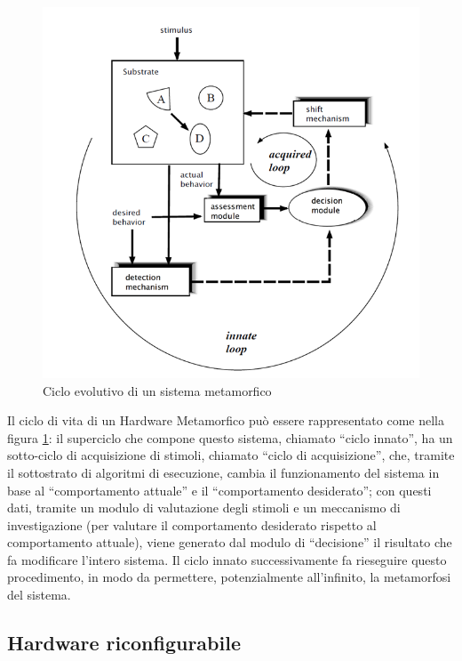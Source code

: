 \documentclass[a4paper,titlepage]{book}
\begin{document}
\begin{figure}
\centering
\includegraphics[scale=0.6]{ciclo_evolutivo.png}
\caption{Ciclo evolutivo di un sistema metamorfico}\label{fig:1}
\end{figure}

Il ciclo di vita di un Hardware Metamorfico può essere rappresentato come nella figura \ref{fig:1}: il superciclo che compone questo sistema, chiamato ``ciclo innato'', ha un sotto-ciclo di acquisizione di stimoli, chiamato ``ciclo di acquisizione'', che, tramite il sottostrato di algoritmi di esecuzione, cambia il funzionamento del sistema in base al ``comportamento attuale'' e il ``comportamento desiderato''; con questi dati, tramite un modulo di valutazione degli stimoli e un meccanismo di investigazione (per valutare il comportamento desiderato rispetto al comportamento attuale), viene generato dal modulo di ``decisione'' il risultato che fa modificare l'intero sistema. Il ciclo innato successivamente fa rieseguire questo procedimento, in modo da permettere, potenzialmente all'infinito, la metamorfosi del sistema.

\subsection{Hardware riconfigurabile}
\end{document}
